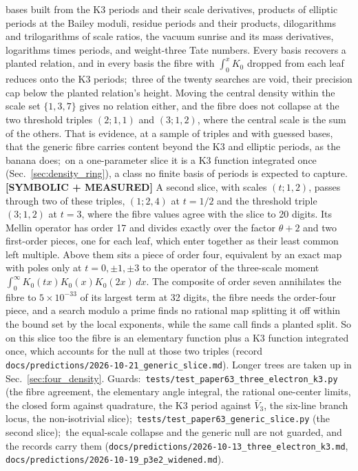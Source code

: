 \documentclass[aps,pra,twocolumn,superscriptaddress,longbibliography]{revtex4-2}
\begin{document}
bases built from the K3 periods and their scale derivatives, products of
elliptic periods at the Bailey moduli, residue periods and their
products, dilogarithms and trilogarithms of scale ratios, the vacuum
sunrise and its mass derivatives, logarithms times periods, and
weight-three Tate numbers.  Every basis recovers a planted relation, and
in every basis the fibre with $\int_0^x K_0$ dropped from each leaf
reduces onto the K3 periods;\ three of the twenty searches are void, their
precision cap below the planted relation's height.  Moving the central
density within the scale set $\{1,3,7\}$ gives no relation either, and the
fibre does not collapse at the two threshold triples $(2;1,1)$ and
$(3;1,2)$, where the central scale is the sum of the others.  That is
evidence, at a sample of triples and with guessed bases, that the generic
fibre carries content beyond the K3 and elliptic periods, as the banana
does;\ on a one-parameter slice it is a K3 function integrated once
(Sec.~\ref{sec:density_ring}), a class no finite basis of periods is
expected to capture.  \textbf{[SYMBOLIC + MEASURED]} A second slice, with
scales $(t;1,2)$, passes through two of these triples, $(1;2,4)$ at $t=1/2$
and the threshold triple $(3;1,2)$ at $t=3$, where the fibre values
agree with the slice to 20 digits.  Its Mellin operator has order 17 and
divides exactly over the factor $\theta+2$ and two first-order pieces,
one for each leaf, which enter together as their least common left
multiple.  Above them sits a piece of order four, equivalent by an exact
map with poles only at $t=0,\pm1,\pm3$ to the operator of the three-scale
moment $\int_0^\infty K_0(tx)K_0(x)K_0(2x)\,dx$.  The composite of order
seven annihilates the fibre to $5\times10^{-33}$ of its largest term at
32 digits, the fibre needs the order-four piece, and a search modulo a
prime finds no rational map splitting it off within the bound set by the
local exponents, while the same call finds a planted split.  So on this
slice too the fibre is an elementary function plus a K3 function
integrated once, which accounts for the null at those two triples
(record \texttt{docs/predictions/2026-10-21\_generic\_slice.md}).
Longer trees are taken up in Sec.~\ref{sec:four_density}.
Guards:\ \texttt{tests/test\_paper63\_three\_electron\_k3.py}
(the fibre agreement, the elementary angle integral, the rational
one-center limits, the closed form against quadrature, the K3 period
against $\bar V_3$, the six-line branch locus, the non-isotrivial slice);\
\texttt{tests/test\_paper63\_generic\_slice.py} (the second slice);\
the equal-scale collapse and the generic null are not guarded, and the
records carry them (\texttt{docs/predictions/2026-10-13\_three\_electron\_k3.md},
\texttt{docs/predictions/2026-10-19\_p3e2\_widened.md}).
\end{document}
